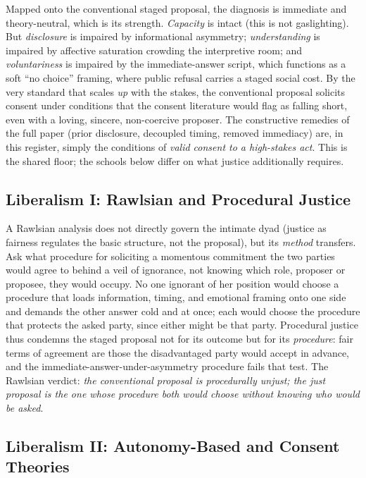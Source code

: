 \documentclass[11pt,a4paper]{article}
\begin{document}
Mapped onto the conventional staged proposal, the diagnosis is immediate and theory-neutral, which is its strength. \emph{Capacity} is intact (this is not gaslighting). But \emph{disclosure} is impaired by informational asymmetry; \emph{understanding} is impaired by affective saturation crowding the interpretive room; and \emph{voluntariness} is impaired by the immediate-answer script, which functions as a soft ``no choice'' framing, where public refusal carries a staged social cost. By the very standard that scales \emph{up} with the stakes, the conventional proposal solicits consent under conditions that the consent literature would flag as falling short, even with a loving, sincere, non-coercive proposer. The constructive remedies of the full paper (prior disclosure, decoupled timing, removed immediacy) are, in this register, simply the conditions of \emph{valid consent to a high-stakes act}. This is the shared floor; the schools below differ on what justice additionally requires.

\subsection{Liberalism I: Rawlsian and Procedural Justice}

A Rawlsian analysis does not directly govern the intimate dyad (justice as fairness regulates the basic structure, not the proposal), but its \emph{method} transfers. Ask what procedure for soliciting a momentous commitment the two parties would agree to behind a veil of ignorance, not knowing which role, proposer or proposee, they would occupy. No one ignorant of her position would choose a procedure that loads information, timing, and emotional framing onto one side and demands the other answer cold and at once; each would choose the procedure that protects the asked party, since either might be that party. Procedural justice thus condemns the staged proposal not for its outcome but for its \emph{procedure}: fair terms of agreement are those the disadvantaged party would accept in advance, and the immediate-answer-under-asymmetry procedure fails that test. The Rawlsian verdict: \emph{the conventional proposal is procedurally unjust; the just proposal is the one whose procedure both would choose without knowing who would be asked}.

\subsection{Liberalism II: Autonomy-Based and Consent Theories}
\end{document}
